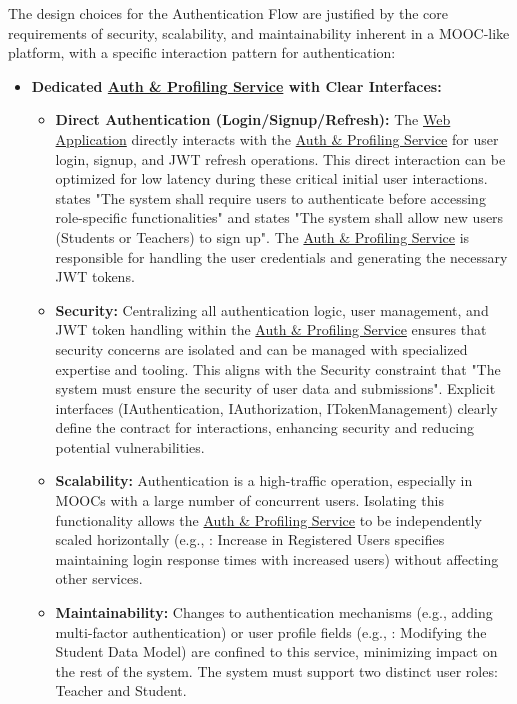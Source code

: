 \begin{justify}
    The design choices for the Authentication Flow are justified by the core requirements of security, scalability, and maintainability inherent in a MOOC-like platform, with a specific interaction pattern for authentication:
\end{justify}
\begin{itemize}
    \item \textbf{Dedicated \hyperref[def:AuthProfilingService]{Auth \& Profiling Service} with Clear Interfaces:}
    \begin{itemize}
        \item \textbf{Direct Authentication (Login/Signup/Refresh):} The \hyperref[def:WebApplication]{Web Application} directly interacts with the \hyperref[def:AuthProfilingService]{Auth \& Profiling Service} for user login, signup, and JWT refresh operations. This direct interaction can be optimized for low latency during these critical initial user interactions.  states "The system shall require users to authenticate before accessing role-specific functionalities" and  states "The system shall allow new users (Students or Teachers) to sign up". The \hyperref[def:AuthProfilingService]{Auth \& Profiling Service} is responsible for handling the user credentials and generating the necessary JWT tokens.
        \item \textbf{Security:} Centralizing all authentication logic, user management, and JWT token handling within the \hyperref[def:AuthProfilingService]{Auth \& Profiling Service} ensures that security concerns are isolated and can be managed with specialized expertise and tooling. This aligns with the Security constraint that "The system must ensure the security of user data and submissions". Explicit interfaces (IAuthentication, IAuthorization, ITokenManagement) clearly define the contract for interactions, enhancing security and reducing potential vulnerabilities.
        \item \textbf{Scalability:} Authentication is a high-traffic operation, especially in MOOCs with a large number of concurrent users. Isolating this functionality allows the \hyperref[def:AuthProfilingService]{Auth \& Profiling Service} to be independently scaled horizontally (e.g., : Increase in Registered Users specifies maintaining login response times with increased users) without affecting other services.
        \item \textbf{Maintainability:} Changes to authentication mechanisms (e.g., adding multi-factor authentication) or user profile fields (e.g., : Modifying the Student Data Model) are confined to this service, minimizing impact on the rest of the system. The system must support two distinct user roles: Teacher and Student.
    \end{itemize}


\end{itemize}
